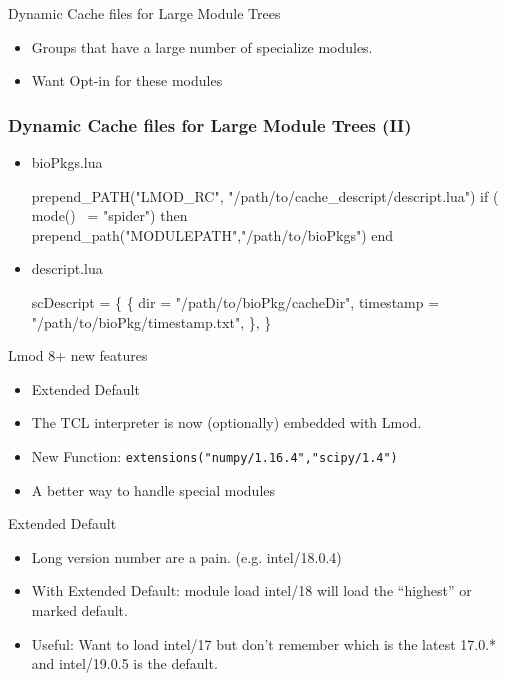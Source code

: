 \documentclass{beamer}
\begin{document}
\begin{frame}{Dynamic Cache files for Large Module Trees}
  \begin{itemize}
    \item Groups that have a large number of specialize modules.
    \item Want Opt-in for these modules
  \end{itemize}
\end{frame}

\begin{frame}[fragile]
  \frametitle{Dynamic Cache files for Large Module Trees (II)}
  \begin{itemize}
    \item bioPkgs.lua
    {\tiny
\begin{semiverbatim}
  prepend\_PATH("LMOD\_RC", "/path/to/cache\_descript/descript.lua")
  if ( mode() ~= "spider") then 
     prepend\_path("MODULEPATH","/path/to/bioPkgs")
  end
\end{semiverbatim}
    }
    \item descript.lua
    {\tiny
\begin{semiverbatim}
  scDescript = \{
     \{
        dir = "/path/to/bioPkg/cacheDir",
        timestamp = "/path/to/bioPkg/timestamp.txt",
     \},
  \}
\end{semiverbatim}
    }
    \end{itemize}
\end{frame}


\begin{frame}{Lmod 8+ new features}
  \begin{itemize}
    \item Extended Default
    \item The TCL interpreter is now (optionally) embedded with Lmod.
    \item New Function: \texttt{extensions("numpy/1.16.4","scipy/1.4")}
    \item A better way to handle special modules
  \end{itemize}
\end{frame}

\begin{frame}{Extended Default}
  \begin{itemize}
    \item Long version number are a pain. (e.g. intel/18.0.4)
    \item With Extended Default: module load intel/18 will load the
      ``highest'' or marked default.
    \item Useful: Want to load intel/17 but don't
      remember which is the latest 17.0.* and intel/19.0.5 is the default.
  \end{itemize}
\end{frame}
\end{document}
